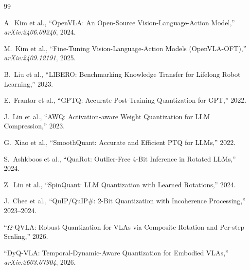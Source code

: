 \documentclass[conference]{IEEEtran}
\begin{document}
\begin{thebibliography}{99}

  A.~Kim et al., ``OpenVLA: An Open-Source Vision-Language-Action Model,''
  \textit{arXiv:2406.09246}, 2024.

  M.~Kim et al., ``Fine-Tuning Vision-Language-Action Models (OpenVLA-OFT),''
  \textit{arXiv:2409.12191}, 2025.

  B.~Liu et al., ``LIBERO: Benchmarking Knowledge Transfer for Lifelong Robot Learning,'' 2023.

  E.~Frantar et al., ``GPTQ: Accurate Post-Training Quantization for GPT,'' 2022.

  J.~Lin et al., ``AWQ: Activation-aware Weight Quantization for LLM Compression,'' 2023.

  G.~Xiao et al., ``SmoothQuant: Accurate and Efficient PTQ for LLMs,'' 2022.

  S.~Ashkboos et al., ``QuaRot: Outlier-Free 4-Bit Inference in Rotated LLMs,'' 2024.

  Z.~Liu et al., ``SpinQuant: LLM Quantization with Learned Rotations,'' 2024.

  J.~Chee et al., ``QuIP/QuIP\#: 2-Bit Quantization with Incoherence Processing,'' 2023--2024.

  ``$\Omega$-QVLA: Robust Quantization for VLAs via Composite Rotation and Per-step Scaling,''
  2026.

  ``DyQ-VLA: Temporal-Dynamic-Aware Quantization for Embodied VLAs,''
  \textit{arXiv:2603.07904}, 2026.

\end{thebibliography}
\end{document}
